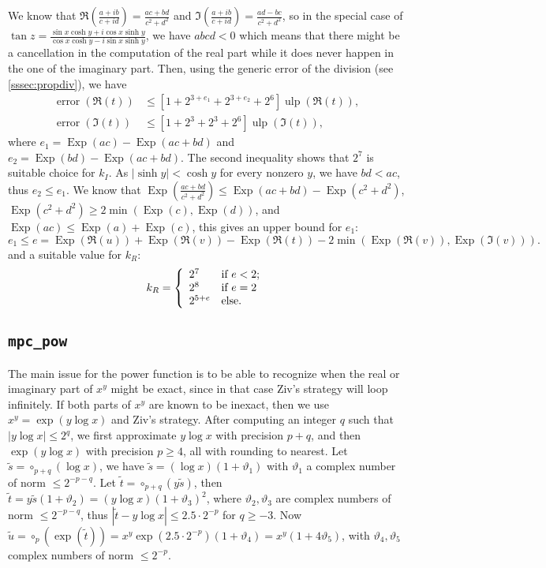\documentclass [12pt]{article}
\newcommand {\Ulp}{{\operatorname {ulp}}}
\DeclareMathOperator{\Exp}{\operatorname {Exp}}
\newcommand{\error}{\operatorname {error}}
\newcommand {\round}{\operatorname {\circ}}
\renewcommand {\theta}{\vartheta}
\renewcommand {\leq}{\leqslant}
\renewcommand {\geq}{\geqslant}
\begin{document}
We know that $\Re(\frac{a+i b}{c+i d})=\frac{a c +b d}{c^2 + d^2}$ and
$\Im(\frac{a+i b}{c+i d})=\frac{a d -b c}{c^2 + d^2}$, so in the special case
of $\tan z=\frac{\sin x\cosh y+i\cos x\sinh y}{\cos x\cosh y-i\sin x\sinh y}$,
we have $abcd < 0$ which means that there might be a cancellation in the
computation of the real part while it does never happen in the one of the
imaginary part.  Then, using the generic error of the division (see
\ref{sssec:propdiv}), we have
\begin{align*}
\error(\Re(t)) &\leq [1+2^{3+e_1}+2^{3+e_2}+2^6] \Ulp(\Re(t)),
\\
\error(\Im(t)) &\leq [1+2^3+2^3+2^6] \Ulp(\Im(t)),
\end{align*}
where $e_1=\Exp(a c) -\Exp(a c+b d)$ and $e_2=\Exp(b d) -\Exp(a c+b d)$.  The
second inequality shows that $2^7$ is suitable choice for $k_I$. As $|\sinh
y|<\cosh y$ for every nonzero $y$, we have $bd<ac$, thus $e_2\leq e_1$. We
know that $\Exp(\frac{a c+b d}{c^2+d^2})\leq \Exp(a c+b d) -\Exp(c^2+d^2)$,
$\Exp(c^2+d^2)\geq2 \min(\Exp(c), \Exp(d))$, and $\Exp(ac) \leq \Exp(a) +
\Exp(c)$, this gives an upper bound for $e_1$:
\[
e_1 \leq e = \Exp(\Re(u)) +\Exp(\Re(v)) -\Exp(\Re(t))
-2 \min(\Exp(\Re(v)), \Exp(\Im(v))).
\]
and a suitable value for $k_R$:
\begin{equation*}
k_R=\left\{
\begin{array}{l l}
  2^7 & \mbox{if $e < 2$;}
  \\
  2^8 & \mbox{if $e = 2$}
  \\
  2^{5 + e} & \mbox{else.}
\end{array}
\right.
\end{equation*}

\subsection {\texttt {mpc\_pow}}

The main issue for the power function is to be able to recognize when the
real or imaginary part of $x^y$ might be exact, since in that case
Ziv's strategy will loop infinitely.
If both parts of $x^y$ are known to be inexact, then we use
$x^y = \exp(y \log x)$ and Ziv's strategy.
After computing an integer $q$ such that $|y \log x| \leq 2^q$, we first
approximate $y \log x$ with precision $p + q$, and then
$\exp(y \log x)$ with precision $p \geq 4$, all with rounding
to nearest.
Let $\tilde{s} = \round_{p+q}(\log x)$,
we have $\tilde{s} = (\log x) (1 + \theta_1)$
with $\theta_1$ a complex number of norm $\leq 2^{-p-q}$.
Let $\tilde{t} = \round_{p+q}(y \tilde{s})$, then
$\tilde{t} = y \tilde{s} (1 + \theta_2) = (y \log x) (1 + \theta_3)^2$,
where $\theta_2, \theta_3$ are complex numbers of norm $\leq 2^{-p-q}$,
thus $|\tilde{t} - y \log x| \leq 2.5 \cdot 2^{-p}$ for $q \geq -3$.
Now $\tilde{u} = \round_p(\exp(\tilde{t})) =
x^y \exp(2.5 \cdot 2^{-p}) (1 + \theta_4) = x^y (1 + 4 \theta_5)$,
with $\theta_4, \theta_5$ complex numbers of norm $\leq 2^{-p}$.
\end{document}
